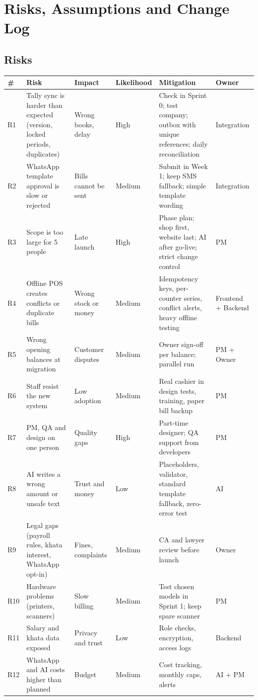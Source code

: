 \documentclass[11pt,a4paper]{article}
\newcommand{\hdr}{\rowcolor{hdrgray}\bfseries}
\begin{document}
\section{Risks, Assumptions and Change Log}
\subsection{Risks}
{\small
\begin{longtable}{L{0.9cm}L{3.8cm}L{2.2cm}L{1.8cm}L{5.2cm}L{2.6cm}}
\hdr \# & Risk & Impact & Likelihood & Mitigation & Owner \\ \endhead
R1 & Tally sync is harder than expected (version, locked periods, duplicates) & Wrong books, delay & High & Check in Sprint 0; test company; outbox with unique references; daily reconciliation & Integration \\
R2 & WhatsApp template approval is slow or rejected & Bills cannot be sent & Medium & Submit in Week 1; keep SMS fallback; simple template wording & Integration \\
R3 & Scope is too large for 5 people & Late launch & High & Phase plan; shop first, website last; AI after go-live; strict change control & PM \\
R4 & Offline POS creates conflicts or duplicate bills & Wrong stock or money & Medium & Idempotency keys, per-counter series, conflict alerts, heavy offline testing & Frontend + Backend \\
R5 & Wrong opening balances at migration & Customer disputes & Medium & Owner sign-off per balance; parallel run & PM + Owner \\
R6 & Staff resist the new system & Low adoption & Medium & Real cashier in design tests, training, paper bill backup & PM \\
R7 & PM, QA and design on one person & Quality gaps & High & Part-time designer; QA support from developers & PM \\
R8 & AI writes a wrong amount or unsafe text & Trust and money & Low & Placeholders, validator, standard template fallback, zero-error test & AI \\
R9 & Legal gaps (payroll rules, khata interest, WhatsApp opt-in) & Fines, complaints & Medium & CA and lawyer review before launch & Owner \\
R10 & Hardware problems (printers, scanners) & Slow billing & Medium & Test chosen models in Sprint 1; keep spare scanner & PM \\
R11 & Salary and khata data exposed & Privacy and trust & Low & Role checks, encryption, access logs & Backend \\
R12 & WhatsApp and AI costs higher than planned & Budget & Medium & Cost tracking, monthly caps, alerts & AI + PM \\
\end{longtable}
}
\end{document}
